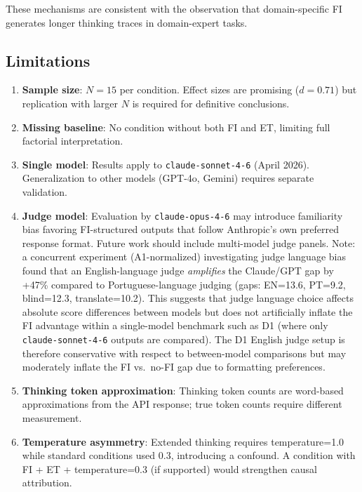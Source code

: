 \documentclass[11pt,a4paper]{article}
\begin{document}
These mechanisms are consistent with the observation that domain-specific FI
generates longer thinking traces in domain-expert tasks.

\subsection{Limitations}

\begin{enumerate}
  \item \textbf{Sample size}: $N = 15$ per condition. Effect sizes are promising
    ($d = 0.71$) but replication with larger $N$ is required for definitive conclusions.

  \item \textbf{Missing baseline}: No condition without both FI and ET, limiting
    full factorial interpretation.

  \item \textbf{Single model}: Results apply to \texttt{claude-sonnet-4-6} (April 2026).
    Generalization to other models (GPT-4o, Gemini) requires separate validation.

  \item \textbf{Judge model}: Evaluation by \texttt{claude-opus-4-6} may introduce
    familiarity bias favoring FI-structured outputs that follow Anthropic's own
    preferred response format. Future work should include multi-model judge panels.
    Note: a concurrent experiment (A1-normalized) investigating judge language bias
    found that an English-language judge \emph{amplifies} the Claude/GPT gap by +47\%
    compared to Portuguese-language judging (gaps: EN=13.6, PT=9.2, blind=12.3,
    translate=10.2). This suggests that judge language choice affects absolute score
    differences between models but does not artificially inflate the FI advantage
    within a single-model benchmark such as D1 (where only
    \texttt{claude-sonnet-4-6} outputs are compared). The D1 English judge setup
    is therefore conservative with respect to between-model comparisons but
    may moderately inflate the FI vs.\ no-FI gap due to formatting preferences.

  \item \textbf{Thinking token approximation}: Thinking token counts are word-based
    approximations from the API response; true token counts require different
    measurement.

  \item \textbf{Temperature asymmetry}: Extended thinking requires temperature=1.0
    while standard conditions used 0.3, introducing a confound. A condition with
    FI + ET + temperature=0.3 (if supported) would strengthen causal attribution.
\end{enumerate}
\end{document}
